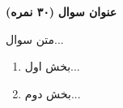 \Large \textbf{عنوان سوال}
\large \textbf{(۳۰ نمره)}

\normalsize \vspace{0.5cm}
متن سوال...
\begin{enumerate}[label=(\alph*)]
	\item
	بخش اول...
	\item 
	بخش دوم...
\end{enumerate}


